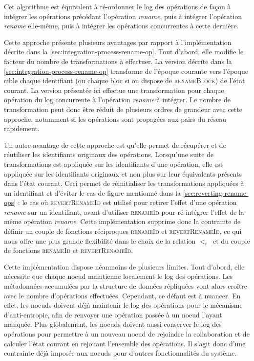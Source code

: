 \documentclass[12pt]{thesul}
\newcommand{\lepoch}{$<_{\varepsilon}$~}
\begin{document}
Cet algorithme est équivalent à ré-ordonner le log des opérations de façon à intégrer les opérations précédant l'opération \emph{rename}, puis à intégrer l'opération \emph{rename} elle-même, puis à intégrer les opérations concurrentes à cette dernière.

Cette approche présente plusieurs avantages par rapport à l'implémentation décrite dans la \autoref{sec:integration-process-rename-op}.
Tout d'abord, elle modifie le facteur du nombre de transformations à effectuer.
La version décrite dans la \autoref{sec:integration-process-rename-op} transforme de l'époque courante vers l'époque cible chaque identifiant (ou chaque bloc si on dispose de \textsc{renameBlock}) de l'état courant.
La version présentée ici effectue une transformation pour chaque opération du log concurrente à l'opération \emph{rename} à intégrer.
Le nombre de transformation peut donc être réduit de plusieurs ordres de grandeur avec cette approche, notamment si les opérations sont propagées aux pairs du réseau rapidement.

Un autre avantage de cette approche est qu'elle permet de récupérer et de réutiliser les identifiants originaux des opérations.
Lorsqu'une suite de transformations est appliquée sur les identifiants d'une opération, elle est appliquée sur les identifiants originaux et non plus sur leur équivalents présents dans l'état courant.
Ceci permet de réinitialiser les transformations appliquées à un identifiant et d'éviter le cas de figure mentionné dans la \autoref{sec:reverting-rename-ops} : le cas où \textsc{revertRenameId} est utilisé pour retirer l'effet d'une opération \emph{rename} sur un identifiant, avant d'utiliser \textsc{renameId} pour ré-intégrer l'effet de la même opération \emph{rename}.
Cette implémentation supprime donc la contrainte de définir un couple de fonctions réciproques \textsc{renameId} et \textsc{revertRenameId}, ce qui nous offre une plus grande flexibilité dans le choix de la relation \lepoch et du couple de fonctions \textsc{renameId} et \textsc{revertRenameId}.

Cette implémentation dispose néanmoins de plusieurs limites.
Tout d'abord, elle nécessite que chaque noeud maintienne localement le log des opérations.
Les métadonnées accumulées par la structure de données répliquées vont alors croître avec le nombre d'opérations effectuées.
Cependant, ce défaut est à nuancer.
En effet, les noeuds doivent déjà maintenir le log des opérations pour le mécanisme d'anti-entropie, afin de renvoyer une opération passée à un noeud l'ayant manquée.
Plus globalement, les noeuds doivent aussi conserver le log des opérations pour permettre à un nouveau noeud de rejoindre la collaboration et de calculer l'état courant en rejouant l'ensemble des opérations.
Il s'agit donc d'une contrainte déjà imposée aux noeuds pour d'autres fonctionnalités du système.
\end{document}
